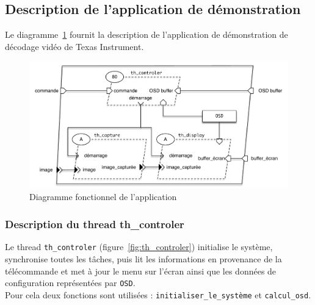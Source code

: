 \documentclass[11pt, a4paper]{paper}
\begin{document}
\subsection{Description de l'application de démonstration}

Le diagramme~\ref{fig:diag_fonc} fournit la description de l'application de démonstration de décodage vidéo de Texas Instrument.

\begin{figure}[htbp]
\begin{center}
\includegraphics[scale=.45]{./figures-pdf/diag_fonc.pdf}
\caption{Diagramme fonctionnel de l'application}
\label{fig:diag_fonc}
\end{center}
\end{figure}
\FloatBarrier

\subsubsection{Description du thread th\_controler}

Le thread {\tt th\_controler} (figure~\ref{fig:th_controler}) initialise le système, synchronise toutes les tâches, puis lit les informations en provenance de la télécommande et met à jour le menu sur l'écran ainsi que les données de configuration représentées par {\tt OSD}.\\
Pour cela deux fonctions sont utilisées : {\tt initialiser\_le\_système} et {\tt calcul\_osd}.
\end{document}
